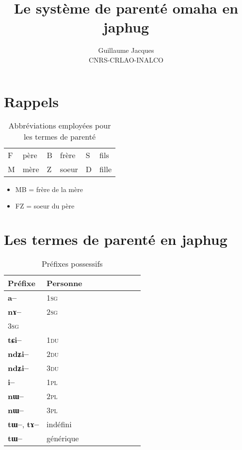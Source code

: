 \documentclass[oneside,a4paper,11pt]{article}
\newcommand{\ipa}[1]{{\phon\textbf{#1}}}
\begin{document}
 
\title{Le système de parenté omaha en japhug}
\author{Guillaume Jacques\\ CNRS-CRLAO-INALCO}
\maketitle

\section{Rappels}
\begin{table}[H]
\caption{Abbréviations employées pour les termes de parenté} \centering
\begin{tabular}{ll|ll|ll}
\toprule
F & père & B & frère & S & fils \\
M & mère & Z & soeur & D & fille \\
\bottomrule
\end{tabular}
\end{table}
\begin{itemize}
\item MB = frère de la mère
\item FZ = soeur du père
\end{itemize}
\section{Les termes de parenté en japhug}
\begin{table}[H] \centering
\caption{Préfixes possessifs } 
\begin{tabular}{lllllllll} 
\toprule
 Préfixe & Personne\\
\midrule
	\ipa{a--}  &		1\textsc{sg} \\
	\ipa{nɤ--}  &			2\textsc{sg}\\
		3\textsc{sg}\\
\midrule
\ipa{tɕi--}  &			1\textsc{du} \\
	\ipa{ndʑi--}  &		2\textsc{du} \\	
\ipa{ndʑi--}  &		3\textsc{du} \\	
\midrule
	\ipa{i--}  &			1\textsc{pl} \\
	\ipa{nɯ--}  &			2\textsc{pl} \\
	\ipa{nɯ--}  &			3\textsc{pl} \\
\midrule
  \ipa{tɯ--},  \ipa{tɤ--} & indéfini \\
  \ipa{tɯ--}   &  générique \\
\bottomrule
\end{tabular}
\end{table}
\end{document}
